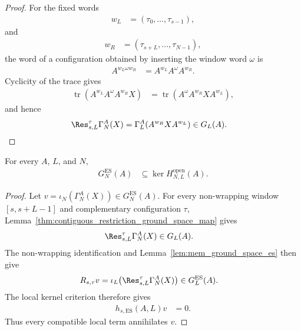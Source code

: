 \begin{proof}
    \leanok
    For the fixed words
    \begin{align}
        w_L & =(\tau_0,\ldots,\tau_{s-1}),
    \end{align}
    and
    \begin{align}
        w_R & =(\tau_{s+L},\ldots,\tau_{N-1}),
    \end{align}
    the word of a configuration obtained by inserting the window word $\omega$
    is
    \begin{align}
        A^{w_L\omega w_R} & =A^{w_L}A^\omega A^{w_R}.
    \end{align}
    Cyclicity of the trace gives
    \begin{align}
        \operatorname{tr}\!\left(A^{w_L}A^\omega A^{w_R}X\right)
         & =\operatorname{tr}\!\left(A^\omega A^{w_R}XA^{w_L}\right),
    \end{align}
    and hence
    \begin{align}
        \Res^\tau_{s,L}\Gamma_N^A(X)
         & =\Gamma_L^A\!\left(A^{w_R}XA^{w_L}\right)\in G_L(A).
    \end{align}
\end{proof}

\begin{lemma}
    \label{thm:open_ground_space_le_hamiltonian_kernel}
    \leanok
    For every $A$, $L$, and $N$,
    \begin{align}
        G_N^{\mathrm{ES}}(A)
         & \subseteq \ker H^{\mathrm{open}}_{N,L}(A).
    \end{align}
\end{lemma}

\begin{proof}
    \leanok
    Let $v=\iota_N(\Gamma_N^A(X))\in G_N^{\mathrm{ES}}(A)$. For every
    non-wrapping window $[s,s+L-1]$ and complementary configuration $\tau$,
    Lemma~\ref{thm:contiguous_restriction_ground_space_map} gives
    \begin{align}
        \Res^\tau_{s,L}\Gamma_N^A(X) & \in G_L(A).
    \end{align}
    The non-wrapping identification and
    Lemma~\ref{lem:mem_ground_space_es} then give
    \begin{align}
        R_{s,\tau}v
         & =\iota_L\!\left(\Res^\tau_{s,L}\Gamma_N^A(X)\right)
        \in G_L^{\mathrm{ES}}(A).
    \end{align}
    The local kernel criterion therefore gives
    \begin{align}
        h_{s,\mathrm{ES}}(A,L)v & =0.
    \end{align}
    Thus every compatible local term annihilates $v$.
\end{proof}

